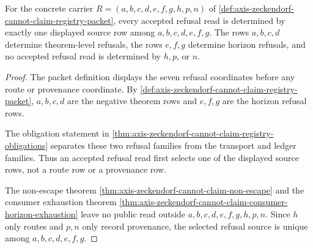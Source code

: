 \begin{theorem}
\label{thm:axis-zeckendorf-cannot-claim-refusal-row-determinacy}
For the concrete carrier $R=(a,b,c,d,e,f,g,h,p,n)$ of \autoref{def:axis-zeckendorf-cannot-claim-registry-packet}, every accepted refusal read is determined by exactly one displayed source row among $a,b,c,d,e,f,g$. The rows $a,b,c,d$ determine theorem-level refusals, the rows $e,f,g$ determine horizon refusals, and no accepted refusal read is determined by $h,p$, or $n$.
\end{theorem}
\begin{proof}
The packet definition displays the seven refusal coordinates before any route or provenance coordinate. By \autoref{def:axis-zeckendorf-cannot-claim-registry-packet}, $a,b,c,d$ are the negative theorem rows and $e,f,g$ are the horizon refusal rows.

The obligation statement in \autoref{thm:axis-zeckendorf-cannot-claim-registry-obligations} separates these two refusal families from the transport and ledger families. Thus an accepted refusal read first selects one of the displayed source rows, not a route row or a provenance row.

The non-escape theorem \autoref{thm:axis-zeckendorf-cannot-claim-non-escape} and the consumer exhaustion theorem \autoref{thm:axis-zeckendorf-cannot-claim-consumer-horizon-exhaustion} leave no public read outside $a,b,c,d,e,f,g,h,p,n$. Since $h$ only routes and $p,n$ only record provenance, the selected refusal source is unique among $a,b,c,d,e,f,g$.
\end{proof}

